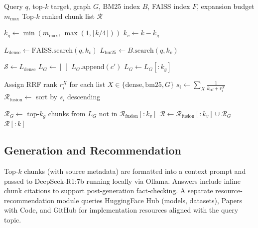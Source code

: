 \documentclass[journal]{IEEEtran}
\begin{document}
\begin{algorithm}[!t]
\caption{Adaptive Hybrid Retrieval (AHR)}
\label{alg:ahr}
\begin{algorithmic}[1]
\Require Query $q$, top-$k$ target, graph $G$, BM25 index $B$,
         FAISS index $F$, expansion budget $m_{\max}$
\Ensure Top-$k$ ranked chunk list $\mathcal{R}$

\State $k_g \gets \min(m_{\max},\, \max(1, \lfloor k/4 \rfloor))$
\State $k_v \gets k - k_g$

\State $L_{\mathrm{dense}} \gets \mathrm{FAISS.search}(q, k_v)$
\State $L_{\mathrm{bm25}} \gets B.\mathrm{search}(q, k_v)$

\State $\mathcal{S} \gets L_{\mathrm{dense}}$
\State $L_G \gets [\ ]$
      \State $L_G.\mathrm{append}(c')$
    \EndIf
  \EndFor
\EndFor
\State $L_G \gets L_G[:k_g]$

\State Assign RRF rank $r^X_i$ for each list $X \in \{\mathrm{dense, bm25}, G\}$
  \State $s_i \gets \sum_{X} \tfrac{1}{k_{\mathrm{rrf}}+r^X_i}$
\EndFor
\State $\mathcal{R}_{\mathrm{fusion}} \gets$ sort by $s_i$ descending

\State $\mathcal{R}_G \gets$ top-$k_g$ chunks from $L_G$ not in $\mathcal{R}_{\mathrm{fusion}}[:k_v]$
\State $\mathcal{R} \gets \mathcal{R}_{\mathrm{fusion}}[:k_v] \cup \mathcal{R}_G$
\State \Return $\mathcal{R}[:k]$
\end{algorithmic}
\end{algorithm}

\subsection{Generation and Recommendation}
Top-$k$ chunks (with source metadata) are formatted into a
context prompt and passed to DeepSeek-R1:7b running locally via
Ollama. Answers include inline chunk citations to support
post-generation fact-checking. A separate resource-recommendation
module queries HuggingFace Hub (models, datasets), Papers with Code,
and GitHub for implementation resources aligned with the query topic.
\end{document}

